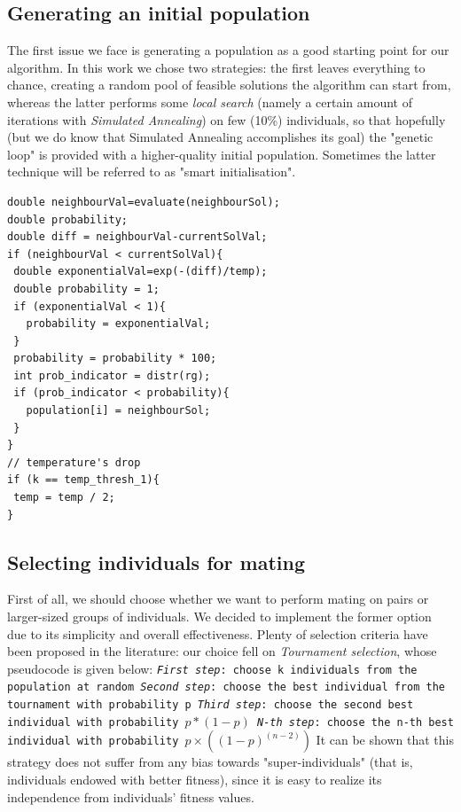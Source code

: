 \documentclass[letterpaper, 10 pt, conference]{ieeeconf}  %
\begin{document}
\subsection{Generating an initial population}
The first issue we face is generating a population as a good starting point for our algorithm. In this work we chose two strategies: the first leaves everything to chance, creating a random pool of feasible solutions the algorithm can start from, whereas the latter performs some \textit{local search} (namely a certain amount of iterations with \textit{Simulated Annealing}) on few (10\%) individuals, so that hopefully (but we do know that Simulated Annealing accomplishes its goal) the "genetic loop" is provided with a higher-quality initial population. Sometimes the latter technique will be referred to as "smart initialisation".
\begin{lstlisting}[caption={Code within main annealing loop, from \texttt{TSPPopulation.cpp}}]
double neighbourVal=evaluate(neighbourSol);   
double probability;
double diff = neighbourVal-currentSolVal;
if (neighbourVal < currentSolVal){
 double exponentialVal=exp(-(diff)/temp); 
 double probability = 1;
 if (exponentialVal < 1){
   probability = exponentialVal;
 }
 probability = probability * 100;    
 int prob_indicator = distr(rg);		
 if (prob_indicator < probability){   					
   population[i] = neighbourSol;
 }				
}
// temperature's drop
if (k == temp_thresh_1){
 temp = temp / 2;
}
\end{lstlisting}

\subsection{Selecting individuals for mating}
First of all, we should choose whether we want to perform mating on pairs
or larger-sized groups of individuals. We decided to implement the former option due to its simplicity and overall effectiveness. \newline
Plenty of selection criteria have been proposed in the literature: our choice fell on \textit{Tournament selection}, whose pseudocode is given below: \newline\newline
\texttt{\textit{First step}: choose k individuals from the population at random
\newline \textit{Second step}: choose the best individual from the 
tournament with probability p
\newline \textit{Third step}: choose the second best individual 
with probability $p*(1-p)$
\newline \textit{N-th step}: choose the n-th best individual 
with probability $p\times((1-p)^(n-2))$}
\newline\newline
It can be shown that this strategy does not suffer from any bias towards "super-individuals" (that is, individuals endowed with better fitness), since it is easy to realize its independence from individuals' fitness values.
\end{document}
